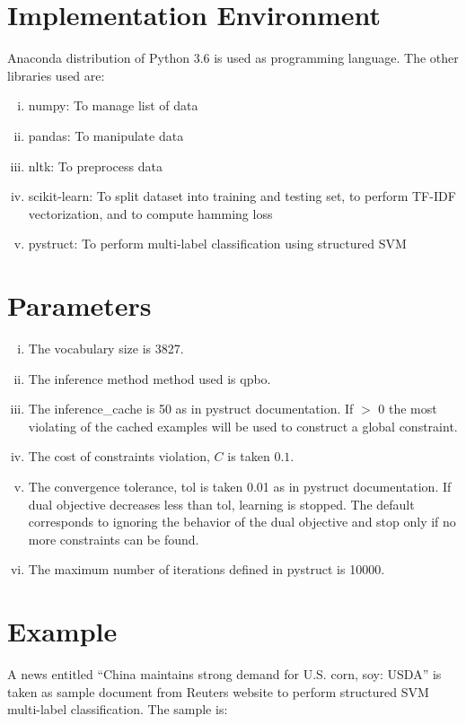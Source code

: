 \section{Implementation Environment}
Anaconda distribution of Python 3.6 is used as programming language. The other libraries used are:
\begin{enumerate}[i.]
\item numpy: To manage list of data
\item pandas: To manipulate data
\item nltk: To preprocess data
\item scikit-learn: To split dataset into training and testing set, to perform TF-IDF vectorization, and to compute hamming loss
\item pystruct: To perform multi-label classification using structured SVM
\end{enumerate}

\section{Parameters}
\begin{enumerate}[i.]
\item The vocabulary size is 3827.
\item The inference method method used is qpbo.
\item The inference\_cache is 50 as in pystruct documentation. If  $>$ 0 the most violating of the cached examples will be used to construct a global constraint.
\item The cost of constraints violation, $C$ is taken $0.1$.
\item The convergence tolerance, tol is taken 0.01 as in pystruct documentation. If dual objective decreases less than tol, learning is stopped. The default corresponds to ignoring the behavior of the dual objective and stop only if no more constraints can be found.
\item The maximum number of iterations defined in pystruct is 10000.
\end{enumerate}

\section{Example}
A news entitled “China maintains strong demand for U.S. corn, soy: USDA” is taken as sample document from Reuters website\cite{reuters-ex} to perform structured SVM multi-label classification. The sample is:

